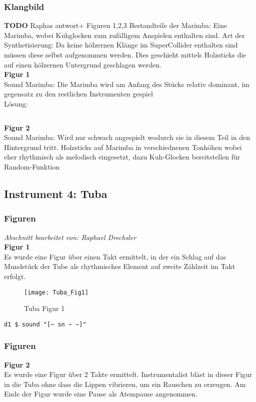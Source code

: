 \documentclass[
10pt, %
a4paper, %
oneside, %
headinclude,footinclude, %
BCOR5mm, %
]{scrartcl}
\begin{document}
\subsubsection{Klangbild}
{\color{red}\textbf{TODO}} Raphas antwort+ Figuren 1,2,3
Bestandteile der Marimba: Eine Marimba, wobei Kuhglocken zum zufälligem Anspielen enthalten sind.
Art der Synthetisierung: Da keine hölzernen Klänge im SuperCollider enthalten sind müssen diese selbst aufgenommen werden. Dies geschieht mittels 
Holzsticks die auf einen hölzernen Untergrund geschlagen werden.\\
\noindent \textbf{Figur 1}\\
Sound Marimba: Die Marimba wird am Anfang des Stücks relativ dominant, im gegensatz zu den restlichen Instrumenten gespiel\\
Lösung:\\
\begin{lstlisting}

\end{lstlisting}
\noindent \textbf{Figur 2}\\
Sound Marimba: Wird nur schwach angespielt wodurch sie in diesem Teil in den Hintergrund tritt.
Holzsticks auf Marimba in verschiednenen Tonhöhen wobei eher rhythmisch als melodisch eingesetzt, dazu Kuh-Glocken bereitstellen für Random-Funktion

\subsection{Instrument 4: Tuba}
\subsubsection{Figuren}
\textit{Abschnitt bearbeitet von: Raphael Drechsler}\\

\noindent\textbf{Figur 1}\\
Es wurde eine Figur über einen Takt ermittelt, in der ein Schlag auf das Mundstück der Tube als rhythmisches Element auf zweite Zählzeit im Takt erfolgt.\\
\begin{figure}[h]
	\centering 
	\texttt{[image: Tuba\_Fig1]} 
	\caption{Tuba Figur 1}
\end{figure}

\begin{lstlisting}
d1 $ sound "[~ sn ~ ~]"
\end{lstlisting}

\subsubsection{Figuren}
\textbf{Figur 2}\\
Es wurde eine Figur über 2 Takte ermittelt. Instrumentalist bläst in dieser Figur in die Tuba ohne dass die Lippen vibrieren, um ein Rauschen zu erzeugen. Am Ende der Figur wurde eine Pause als Atempause angenommen. 
\end{document}
